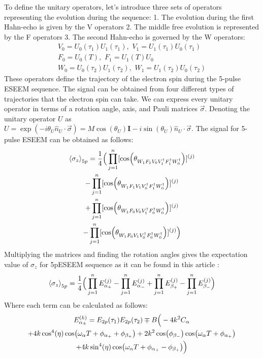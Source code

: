 \documentclass[%
 reprint,
superscriptaddress,
 amsmath,amssymb,
 aps,
]{revtex4-2}
\renewcommand{\vec}[1]{\overrightarrow{#1}}
\begin{document}
To define the unitary operators, let's introduce three sets of operators representing the evolution during the sequence:
1. The evolution during the first Hahn-echo is given by the 
V operators 2. The middle free evolution is represented by the 
F operators 3. The second Hahn-echo is governed by the W operators:
\begin{gather}
	V_0 = U_0 (\tau_1) U_1 (\tau_1),\,\,  V_1 = U_1 (\tau_1) U_0 (\tau_1) \\
	F_0 = U_0 (T), \,\, F_1 = U_1 (T) U_0 \\
	W_0 = U_0 (\tau_2) U_1 (\tau_2), \,\, W_1 = U_1 (\tau_2) U_0 (\tau_2)
\end{gather}
These operators define the trajectory of the electron spin during the 5-pulse ESEEM sequence.
The signal can be obtained from four different types of trajectories that the electron spin can take. We can express every unitary operator in terms of a rotation angle, axis, and Pauli matrices $\vec{\sigma}$. Denoting the unitary operator $U$ as $U = \exp(-i \theta_U \hat{n}_U\cdot\vec{\sigma}) = M\cos(\theta_U) \mathbf{I}- i \sin(\theta_U) \hat{n}_U\cdot\vec{\sigma}$. The signal for 5-pulse ESEEM can be obtained as follows:
\begin{gather}
		\expval{\sigma_z}_{5p} =\frac{1}{4}\Big( \prod_{j=1}^n [\cos(\theta_{W_1 F_1 V_0 V_1^\dagger F_1^\dagger W_0^\dagger})]^{(j)}  \notag \\
		-\prod_{j=1}^n [\cos(\theta_{W_1 F_1 V_1 V_0^\dagger F_1^\dagger W_0^\dagger})]^{(j)}  \notag \\
		+ \prod_{j=1}^n [\cos(\theta_{W_1 F_0 V_0 V_1^\dagger F_0^\dagger W_0^\dagger})]^{(j)}  \notag \\
		-\prod_{j=1}^n [\cos(\theta_{W_1 F_0 V_1 V_0^\dagger F_0^\dagger W_0^\dagger})]^{(j)} \Big)
\end{gather}
Multiplying the matrices and finding the rotation angles gives the expectation value of $\sigma_z$ for 5pESEEM sequence as it can be found in this article \cite{kasumaj20085}:
\begin{gather}
	\expval{\sigma_z}_{5p} = \frac{1}{4}\Big( \prod_{j=1}^n E_{\alpha_+}^{(j)} - \prod_{j=1}^n E_{\alpha_-}^{(j)} + \prod_{j=1}^n E_{\beta_+}^{(j)}- \prod_{j=1}^n E_{\beta_-}^{(j)}\Big)
\end{gather}
Where each term can be calculated as follows:
\small   
\begin{gather} 
	E_{\alpha_\pm}^{(k)} = E_{2p}(\tau_1) E_{2p}(\tau_2) \mp B \Big(-4k^2C_\alpha \notag \\
	+4k\cos^4(\eta) \cos(\omega_\alpha T + \phi_{\alpha_+} +\phi_{\beta_+}) 
	+2 k^2 \cos(\phi_{\beta_-}) \cos(\omega_\alpha T+\phi_{\alpha_+}) \notag \\
	+ 4k \sin^4(\eta) \cos(\omega_\alpha T +\phi_{\alpha_+} -\phi_{\beta_+} )\Big)
	\label{eq:eseem}
\end{gather}
\end{document}
